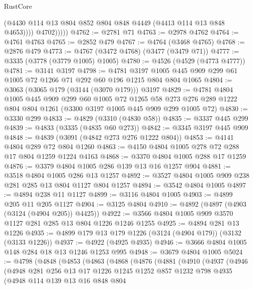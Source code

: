 \begin{lexlean}{RustCore}
\begin{coremodule}
                  (@4430 @114 @13 @804 @852 @804 @848 @4449 (@4413 @114 @13 @848 @4653))))
              @4702)))))
@4762 := @2781 @71
@4763 := @2978 @4762
@4764 := @4761 @4763
@4765 := @2852 @479
@4767 := @4764 (@3468 @4765)
@4768 := @2876 @479
@4773 := @4767 (@3472 @4768) (@3477 (@3479 @71))
@4777 := @3335 (@3778 (@3779 @1005) @1005)
@4780 := @4526 (@4529 (@4773 @4777))
@4781 := @3141 @3197
@4798 := @4781
    @3197
    @1005
    @445
    @909
    @299
    @61
    @1005
    @72
    @1266
    @71
    @292
    @60
    @196
    @1215
    @804
    @804
    @1065
@4804 := @3063 (@3065 @179 (@3144 (@3070 @179))) @3197
@4829 := @4781
    @4804
    @1005
    @445
    @909
    @299
    @60
    @1005
    @72
    @1265
    @58
    @273
    @276
    @289
    @1222
    @804
    @804
    @1261
    (@3300 @3197 @1005 @445 @909 @299 @1005 @72)
@4830 := @3330 @299
@4833 := @4829 (@3310 (@4830 @58))
@4835 := @3337 @445 @299
@4839 := @4833 (@3335 (@4835 @60 @273))
@4842 := @3345 @3197 @445 @909
@4848 := @4839 (@3091 (@4842 @273 @276 @1222 @804))
@4853 := @4141 @4804 @289 @72 @804 @1260
@4863 := @4150 @4804 @1005 @278 @72 @288 @17 @804 @1259 @1224 @4163
@4868 := @3370 @4804 @1005 @288 @17 @1259
@4876 := @3379 @4804 @1005 @286 @139 @13 @16 @1257 @904
@4881 := @3518 @4804 @1005 @286 @13 @1257
@4892 := @3527 @4804 @1005 @909 @238 @281 @285 @13 @804 @1127 @804 @1257
@4894 := @3542 @4804 @1005
@4897 := @4894 @238 @11 @1127
@4899 := @3116 @4804 @1005
@4903 := @4899 @205 @11 @205 @1127
@4904 := @3125 @4804
@4910 := @4892 (@4897 (@4903 (@3124 (@4904 @205)) @4425))
@4922 := @3566 @4804 @1005 @909 @3570 @1127 @281 @285 @13 @804 @1226 @1246 @1255
@4925 := @4894 @281 @13 @1226
@4935 := @4899 @179 @13 @179 @1226 (@3124 (@4904 @179)) (@3132 (@3133 @1226))
@4937 := @4922 (@4925 @4935)
@4946 := @3666 @4804 @1005 @148 @284 @18 @13 @1246 @1253 @995
@4948 := @3679 @4804 @1005
@5024 := @4798
    (@4848
      (@4853
        (@4863
          (@4868
            (@4876
              (@4881
                (@4910
                  (@4937
                    (@4946
                      (@4948
                        @281
                        @256
                        @13
                        @17
                        @1226
                        @1245
                        @1252
                        @857
                        @1232
                        @798
                        @4935
                        (@4948
                          @114
                          @139
                          @13
                          @16
                          @848
                          @804

\end{coremodule}
\end{lexlean}
